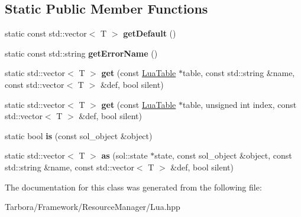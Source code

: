 \subsection*{Static Public Member Functions}
\begin{DoxyCompactItemize}
\item 
\mbox{\label{classTarbora_1_1LuaType_3_01std_1_1vector_3_01T_01_4_01_4_af801001a3d1bc549c667669bbf29090b}} 
static const std\+::vector$<$ T $>$ {\bfseries get\+Default} ()
\item 
\mbox{\label{classTarbora_1_1LuaType_3_01std_1_1vector_3_01T_01_4_01_4_a0cd540653868e72fddc0374a76afb235}} 
static const std\+::string {\bfseries get\+Error\+Name} ()
\item 
\mbox{\label{classTarbora_1_1LuaType_3_01std_1_1vector_3_01T_01_4_01_4_ae37b78820fe3c8d436170a15f6ecae02}} 
static std\+::vector$<$ T $>$ {\bfseries get} (const \hyperlink{classTarbora_1_1LuaTable}{Lua\+Table} $\ast$table, const std\+::string \&name, const std\+::vector$<$ T $>$ \&def, bool silent)
\item 
\mbox{\label{classTarbora_1_1LuaType_3_01std_1_1vector_3_01T_01_4_01_4_a5c3e55776968284a37ed6f3817fb4eba}} 
static std\+::vector$<$ T $>$ {\bfseries get} (const \hyperlink{classTarbora_1_1LuaTable}{Lua\+Table} $\ast$table, unsigned int index, const std\+::vector$<$ T $>$ \&def, bool silent)
\item 
\mbox{\label{classTarbora_1_1LuaType_3_01std_1_1vector_3_01T_01_4_01_4_a9b7fb9a9928ba08630d8f163b02c2c0e}} 
static bool {\bfseries is} (const sol\+\_\+object \&object)
\item 
\mbox{\label{classTarbora_1_1LuaType_3_01std_1_1vector_3_01T_01_4_01_4_a15a4a211bf533674e9f63f913194e59c}} 
static std\+::vector$<$ T $>$ {\bfseries as} (sol\+::state $\ast$state, const sol\+\_\+object \&object, const std\+::string \&name, const std\+::vector$<$ T $>$ \&def, bool silent)
\end{DoxyCompactItemize}


The documentation for this class was generated from the following file\+:\begin{DoxyCompactItemize}
\item 
Tarbora/\+Framework/\+Resource\+Manager/Lua.\+hpp\end{DoxyCompactItemize}
